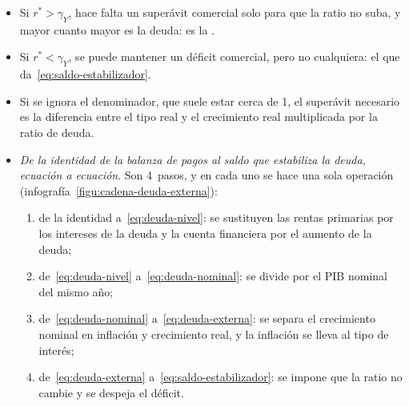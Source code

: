 \documentclass[11pt]{article}
\begin{document}
\begin{itemize}
  \begin{itemize}
  \item Si $r^*>\gamma_Y$, hace falta un superávit comercial solo para que la ratio no suba, y mayor cuanto mayor es la deuda: es la .
  \item Si $r^*<\gamma_Y$, se puede mantener un déficit comercial, pero no cualquiera: el que da~\eqref{eq:saldo-estabilizador}.
  \item Si se ignora el denominador, que suele estar cerca de 1, el superávit necesario es la diferencia entre el tipo real y el crecimiento real multiplicada por la ratio de deuda.
  \end{itemize}
\end{itemize}

\begin{anotaciones}
\begin{itemize}
\item \emph{De la identidad de la balanza de pagos al saldo que estabiliza la deuda, ecuación a ecuación}. Son 4~pasos, y en cada uno se hace una sola operación (infografía~\ref{figu:cadena-deuda-externa}):
  \begin{enumerate}
  \item de la identidad a~\eqref{eq:deuda-nivel}: se sustituyen las rentas primarias por los intereses de la deuda y la cuenta financiera por el aumento de la deuda;
  \item de~\eqref{eq:deuda-nivel} a~\eqref{eq:deuda-nominal}: se divide por el PIB nominal del mismo año;
  \item de~\eqref{eq:deuda-nominal} a~\eqref{eq:deuda-externa}: se separa el crecimiento nominal en inflación y crecimiento real, y la inflación se lleva al tipo de interés;
  \item de~\eqref{eq:deuda-externa} a~\eqref{eq:saldo-estabilizador}: se impone que la ratio no cambie y se despeja el déficit.
  \end{enumerate}
\end{itemize}
\begin{infografiacaja}
\caption{De la identidad de la balanza de pagos al saldo que estabiliza la deuda exterior}\label{figu:cadena-deuda-externa}
\end{infografiacaja}
\end{anotaciones}
\end{document}

